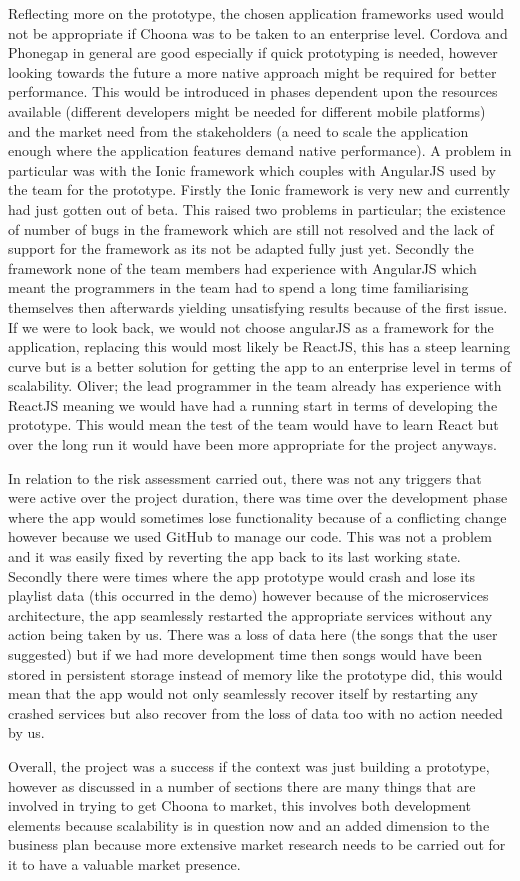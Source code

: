 Reflecting more on the prototype, the chosen application frameworks used would not be appropriate if Choona was to be taken to an enterprise level. Cordova and Phonegap in general are good especially if quick prototyping is needed, however looking towards the future a more native approach might be required for better performance. This would be introduced in phases dependent upon the resources available (different developers might be needed for different mobile platforms) and the market need from the stakeholders (a need to scale the application enough where the application features demand native performance). A problem in particular was with the Ionic framework which couples with AngularJS used by the team for the prototype. Firstly the Ionic framework is very new and currently had just gotten out of beta. This raised two problems in particular; the existence of number of bugs in the framework which are still not resolved and the lack of support for the framework as its not be adapted fully just yet. Secondly the framework none of the team members had experience with AngularJS which meant the programmers in the team had to spend a long time familiarising themselves then afterwards yielding unsatisfying results because of the first issue. If we were to look back, we would not choose angularJS as a framework for the application, replacing this would most likely be ReactJS, this has a steep learning curve but is a better solution for getting the app to an enterprise level in terms of scalability. Oliver; the lead programmer in the team already has experience with ReactJS meaning we would have had a running start in terms of developing the prototype. This would mean the test of the team would have to learn React but over the long run it would have been more appropriate for the project anyways.

In relation to the risk assessment carried out, there was not any triggers that were active over the project duration, there was time over the development phase where the app would sometimes lose functionality because of a conflicting change however because we used GitHub to manage our code. This was not a problem and it was easily fixed by reverting the app back to its last working state. Secondly there were times where the app prototype would crash and lose its playlist data (this occurred in the demo) however because of the microservices architecture, the app seamlessly restarted the appropriate services without any action being taken by us. There was a loss of data here (the songs that the user suggested) but if we had more development time then songs would have been stored in persistent storage instead of memory like the prototype did, this would mean that the app would not only seamlessly recover itself by restarting any crashed services but also recover from the loss of data too with no action needed by us.

Overall, the project was a success if the context was just building a prototype, however as discussed in a number of sections there are many things that are involved in trying to get Choona to market, this involves both development elements because scalability is in question now and an added dimension to the business plan because more extensive market research needs to be carried out for it to have a valuable market presence.
